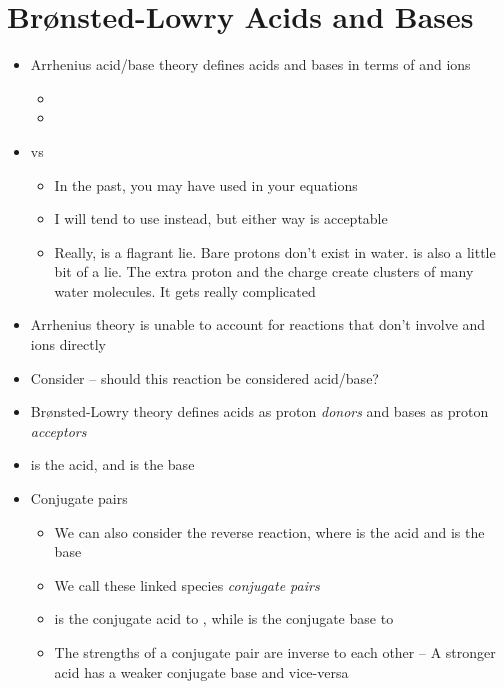 \documentclass[12pt, openany, letterpaper]{memoir}
\begin{document}
\section{Brønsted-Lowry Acids and Bases}
\begin{itemize}
  \item Arrhenius acid/base theory defines acids and bases in terms of  and  ions
	\begin{itemize}
		\item {}
		\item {}
	\end{itemize}
	\item {} vs 
	\begin{itemize}
		\item In the past, you may have used  in your equations
		\item I will tend to use  instead, but either way is acceptable
		\item Really,  is a flagrant lie. Bare protons don't exist in water.  is also a little bit of a lie. The extra proton and the charge create clusters of many water molecules. It gets really complicated
	\end{itemize}
  \item Arrhenius theory is unable to account for reactions that don't involve  and  ions directly
	\item Consider  -- should this reaction be considered acid/base?
	\item Br\o nsted-Lowry theory defines acids as proton \emph{donors} and bases as proton \emph{acceptors}
	\item {} is the acid, and  is the base
	\item Conjugate pairs
	\begin{itemize}
		\item We can also consider the reverse reaction, where  is the acid and  is the base
		\item We call these linked species \emph{conjugate pairs}
		\item {} is the conjugate acid to , while  is the conjugate base to 
		\item The strengths of a conjugate pair are inverse to each other -- A stronger acid has a weaker conjugate base and vice-versa

\end{itemize}
\end{itemize}
\end{document}
